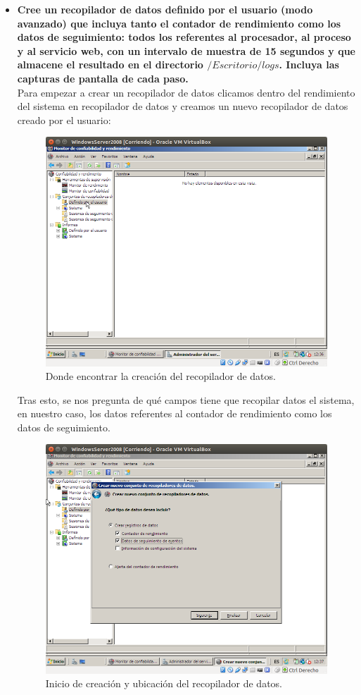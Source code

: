 \begin{itemize}
		\item \textbf{Cree un recopilador de datos definido por el usuario (modo avanzado) que incluya tanto el contador de rendimiento como los datos de seguimiento: todos los referentes al procesador, al proceso y al servicio web, con un intervalo de muestra de 15 segundos y que almacene el resultado en el directorio $/Escritorio/logs$. Incluya las capturas de pantalla de cada paso.}\\
		
		Para empezar a crear un recopilador de datos clicamos dentro del rendimiento del sistema en recopilador de datos y creamos un nuevo recopilador de datos creado por el usuario:\\
		
		\begin{figure}[H]
		\centering
		\includegraphics[width=0.6\linewidth]{recopiladorDatos}
		\caption[recopilador Datos]{Donde encontrar la creación del recopilador de datos.}
		\label{fig:recopiladorDatos}
		\end{figure}

		
		Tras esto, se nos pregunta de qué campos tiene que recopilar datos el sistema, en nuestro caso, los datos referentes al contador de rendimiento como los datos de seguimiento.\\
		\begin{figure}[H]
			\centering
			\includegraphics[width=0.6\linewidth]{InicioRecopiladorDatos}
			\caption[RecopiladorDatos]{Inicio de creación y ubicación del recopilador de datos.}
			\label{fig:InicioRecopiladorDatos}
		\end{figure}
		

\end{itemize}

